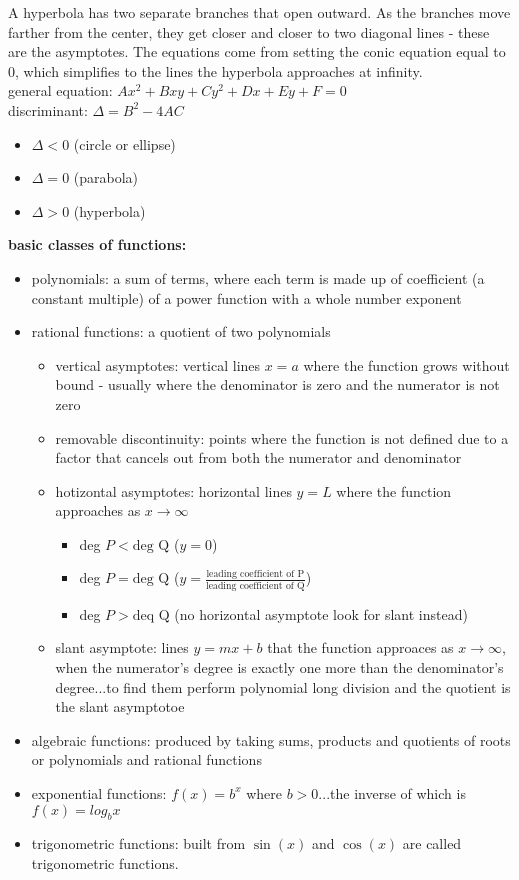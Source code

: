 \documentclass{article}
\begin{document}
A hyperbola has two separate branches that open outward. As the branches move farther from the center, they get closer and closer to two diagonal lines - these are the asymptotes. The equations come from setting the conic equation equal to 0, which simplifies to the lines the hyperbola approaches at infinity.\\

general equation: $Ax^2 + Bxy + Cy^2 + Dx + Ey + F = 0$\\
discriminant: $\Delta = B^2 - 4AC$
	\begin{itemize}
		\item $\Delta < 0$ (circle or ellipse)
		\item $\Delta = 0$ (parabola)
		\item $\Delta > 0$ (hyperbola)
	\end{itemize}

\textbf{basic classes of functions:}\\
	\begin{itemize}
		\item polynomials: a sum of terms, where each term is made up of coefficient (a constant multiple) of a power function with a whole number exponent
		\item rational functions: a quotient of two polynomials
			\begin{itemize}
				\item vertical asymptotes: vertical lines $x = a$ where the function grows without bound - usually where the denominator is zero and the numerator is not zero
				\item removable discontinuity: points where the function is not defined due to a factor that cancels out from both the numerator and denominator
				\item hotizontal asymptotes: horizontal lines $y = L$ where the function approaches as $x \to \infty$\\
					\begin{itemize}
						\item deg $P < \text{deg Q}$ ($y = 0$)
						\item deg $P = \text{deg Q}$ ($y = \frac{\text{leading coefficient of P}}{\text{leading coefficient of Q}}$) 
						\item deg $P > \text{deq Q}$ (no horizontal asymptote look for slant instead)
					\end{itemize}
				\item slant asymptote: lines $y = mx + b$ that the function approaces as $x \to \infty$, when the numerator's degree is exactly one more than the denominator's degree...to find them perform polynomial long division and the quotient is the slant asymptotoe
			\end{itemize}
		\item algebraic functions: produced by taking sums, products and quotients of roots or polynomials and rational functions
		\item exponential functions: $f(x) = b^x$ where $b > 0$...the inverse of which is $f(x) = log_bx$
		\item trigonometric functions: built from $\sin(x)$ and $\cos(x)$ are called trigonometric functions.
	\end{itemize}
\end{document}
